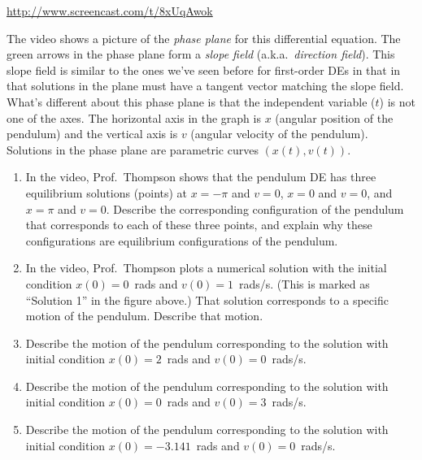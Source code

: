 \documentclass[12pt,letterpaper]{hmcpset}
\begin{document}
\begin{problem}[3]
    \begin{center}
        \url{http://www.screencast.com/t/8xUqAwok}
    \end{center}

    The video shows a picture of the \textit{phase plane} for this differential equation. The green arrows in the phase plane form a \textit{slope field} (a.k.a.~\textit{direction field}).  This slope field is similar to the ones we've seen before for first-order DEs in that in that solutions in the plane must have a tangent vector matching the slope field.  What's different about this phase plane is that the independent variable ($t$) is not one of the axes. The horizontal axis in the graph is $x$ (angular position of the pendulum) and the vertical axis is $v$ (angular velocity of the pendulum). Solutions in the phase plane are parametric curves $(x(t),v(t))$.  
\end{problem}

\begin{problem}[3 cont.]
    \begin{enumerate}
        \item In the video, Prof.~Thompson shows that the pendulum DE has three equilibrium solutions (points) at $x=-\pi$ and $v=0$, $x=0$ and $v=0$, and $x=\pi$ and $v=0$. Describe the corresponding configuration of the pendulum that corresponds to each of these three points, and explain why these configurations are equilibrium configurations of the pendulum.
        \item In the video, Prof.~Thompson plots a numerical solution with the initial condition $x(0)=0$~rads and $v(0)=1$~rads/s.  (This is marked as ``Solution 1'' in the figure above.) That solution corresponds to a specific motion of the pendulum. Describe that motion.
        \item Describe the motion of the pendulum corresponding to the solution with initial condition $x(0)=2$~rads and $v(0)=0$~rads/s.
        \item Describe the motion of the pendulum corresponding to the solution with initial condition $x(0)=0$~rads and $v(0)=3$~rads/s.
        \item Describe the motion of the pendulum corresponding to the solution with initial condition $x(0)=-3.141$~rads and $v(0)=0$~rads/s.
    \end{enumerate}
\end{problem}

\newpage
\begin{solution}
    \null\vfill
\end{solution}
\end{document}
